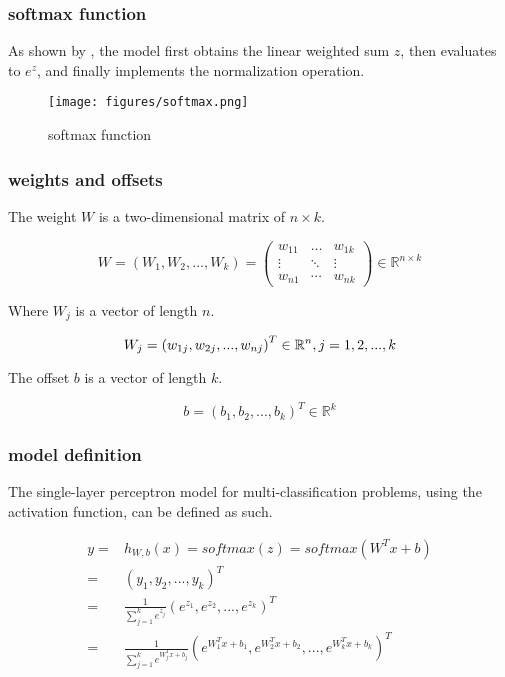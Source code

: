 \begin{content}
\subsubsection{softmax function}

As shown by , the model first obtains the linear weighted sum $z$, then evaluates to $e^z$, and finally implements the normalization operation.

\begin{figure}[H]
\centering
\texttt{[image: figures/softmax.png]}
\caption{softmax function}
 \label{fig:softmax}
\end{figure}

\subsubsection{weights and offsets}

The weight $W$ is a two-dimensional matrix of $n \times k$.

\[
W = \left( {{W_1},{W_2},...,{W_k}} \right) = \left( {\begin{array}{*{20}{c}}
  {{w_{11}}}& \ldots &{{w_{1k}}} \\ 
   \vdots & \ddots & \vdots \\ 
  {{w_{n1}}}& \cdots &{{w_{nk}}} 
\end{array}} \right) \in {\mathbb{R}^{n \times k}}
\]

Where $W_j$ is a vector of length $n$.

\[
{W_j} = {\left( {{w_{1j}},{w_{2j}},...,{w_{nj}}} \right)^T} \in {\mathbb{R}^n }, j = 1,2,...,k \\
\]

The offset $b$ is a  vector of length $k$.

\[
b = {({b_1},{b_2},...,{b_k})^T} \in {\mathbb{R}^k}
\]

\subsubsection{model definition}

The single-layer perceptron model for multi-classification problems, using the  activation function, can be defined as such.

\[\begin{aligned}
  y = & {h_{W,b}}(x) = softmax (z) = softmax ({W^T}x + b) \\ 
   = & {\left( {{y_1},{y_2},...,{y_k}} \right)^T} \\ 
   = & \frac{1}{{\sum\limits_{j = 1}^k {{e^{{z_j}}}} }}{\left( {{e^{{z_1}}},{e ^{{z_2}}},...,{e^{{z_k}}}} \right)^T} \\ 
   = & \frac{1}{{\sum\limits_{j = 1}^k {{e^{W_j^Tx + {b_j}}}} }}{\left( {{e^{W_1^Tx + {b_1}}},{e^{W_2^Tx + {b_2}}},...,{e^{W_k^Tx + {b_k}}}} \right)^T} \ 
\end{aligned} \]


\end{content}
